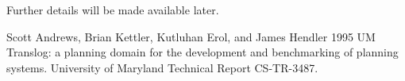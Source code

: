 \documentclass{article}
\begin{document}
Further details will be made available later.
\bigskip

\medskip

Scott Andrews, Brian Kettler, Kutluhan Erol, and James Hendler 1995 UM
Translog: a planning domain for the development and benchmarking of
planning systems.  University of Maryland Technical Report CS-TR-3487.
\end{document}
